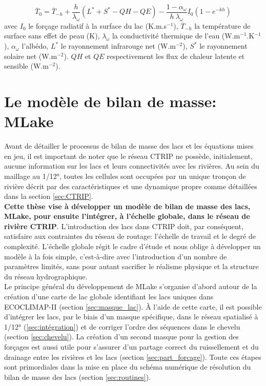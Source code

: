 \begin{equation}
\overline{T}_{0} = \overline{T}_{-h} + \dfrac{h}{\lambda_{\omega}}(L^{*}+S^{*}-QH-QE)-\dfrac{1-\alpha_{\omega}}{h \: \lambda_{\omega}}I_{0}(1-e^{-kh})
\end{equation}
avec $I_{0}$ le forçage radiatif à la surface du lac (K.m.s$^{-1}$), $\overline{T}_{-h}$ la température de surface sans effet de peau (K), $\lambda_{\omega}$ la conductivité thermique de l'eau (W.m$^{-1}$.K$^{-1}$), $\alpha_{\omega}$ l'albédo, $L^{*}$ le rayonnement infrarouge net (W.m$^{-2}$), $S^{*}$ le rayonnement solaire net (W.m$^{-2}$). $QH$ et $QE$ respectivement les flux de chaleur latente et sensible (W.m$^{-2}$).\\

\section{{\selectfont Le modèle de bilan de masse: MLake}}
\label{sec:MLake}

Avant de détailler le processus de bilan de masse des lacs et les équations mises en jeu, il est important de noter que le réseau CTRIP ne possède, initialement, aucune information sur les lacs et leurs connectivités avec les rivières. Au sein du maillage au 1/12°, toutes les cellules sont occupées par un unique tronçon de rivière décrit par des caractéristiques et une dynamique propre comme détaillées dans la section \ref{sec:CTRIP}. \\
\textbf{Cette thèse vise à développer un modèle de bilan de masse des lacs, MLake, pour ensuite l'intégrer, à l'échelle globale, dans le réseau de rivière CTRIP}. L'introduction des lacs dans CTRIP doit, par conséquent, satisfaire aux contraintes du réseau de routage: l'échelle de travail et le degré de complexité. L'échelle globale régit le cadre d'étude et nous oblige à développer un modèle à la fois simple, c'est-à-dire avec l'introduction d'un nombre de paramètres limités, sans pour autant sacrifier le réalisme physique et la structure du réseau hydrographique. \\
Le principe général du développement de MLake s'organise d'abord autour de la création d'une carte de lac globale identifiant les lacs uniques dans ECOCLIMAP-II (section \ref{sec:masque_lac}). À l'aide de cette carte, il est possible d'intégrer les lacs, par le biais d'un masque spécifique, dans le réseau spatialisé à 1/12° (\ref{sec:intégration}) et de corriger l'ordre des séquences dans le chevelu (section \ref{sec:chevelu}). La création d'un second masque pour la gestion des forçages est aussi utile pour s'assurer d'un partage correct du ruissellement et du drainage entre les rivières et les lacs (section \ref{sec:part_forcage}). Toute ces étapes sont primordiales dans la mise en place du schéma numérique de résolution du bilan de masse des lacs (section \ref{sec:routines}).

